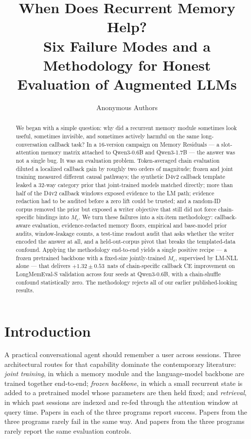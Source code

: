 \documentclass{article}
\title{When Does Recurrent Memory Help?\\
       Six Failure Modes and a Methodology for Honest Evaluation of Augmented LLMs}
\author{Anonymous Authors}
\newcommand{\Mc}{M_{\mathrm{c}}}
\begin{document}
\maketitle

\begin{abstract}
We began with a simple question: why did a recurrent memory module
sometimes look useful, sometimes invisible, and sometimes actively
harmful on the same long-conversation callback task?  In a
$16$-version campaign on Memory Residuals --- a slot-attention memory
matrix attached to Qwen3-0.6B and Qwen3-1.7B --- the answer was not a
single bug.  It was an evaluation problem.  Token-averaged chain
evaluation diluted a localized callback gain by roughly two orders of
magnitude; frozen and joint training measured different causal
pathways; the synthetic D4v2 callback template leaked a $32$-way
category prior that joint-trained models matched directly; more than
half of the D4v2 callback windows exposed evidence to the LM path;
evidence redaction had to be audited before a zero lift could be
trusted; and a random-ID corpus removed the prior but exposed a
writer objective that still did not force chain-specific bindings into
$\Mc$.  We turn these failures into a six-item methodology:
callback-aware evaluation, evidence-redacted memory floors, empirical
and base-model prior audits, window-leakage counts, a test-time
readout audit that asks whether the writer encoded the answer at all,
and a held-out-corpus pivot that breaks the templated-data confound.
Applying the methodology end-to-end yields a single positive recipe
--- a frozen pretrained backbone with a fixed-size jointly-trained
$\Mc$, supervised by LM-NLL alone --- that delivers
$+1.32 \pm 0.53$~nats of chain-specific callback CE improvement on
LongMemEval-S validation across four seeds at Qwen3-0.6B, with a
chain-shuffle confound statistically zero.  The methodology rejects
all of our earlier published-looking results.
\end{abstract}

\section{Introduction}
\label{sec:intro}

A practical conversational agent should remember a user across
sessions.  Three architectural routes for that capability dominate
the contemporary literature: \emph{joint training}, in which a memory
module and the language-model backbone are trained together
end-to-end; \emph{frozen backbone}, in which a small recurrent state
is added to a pretrained model whose parameters are then held fixed;
and \emph{retrieval}, in which past sessions are indexed and re-fed
through the attention window at query time.  Papers in each of the
three programs report success.  Papers from the three programs
rarely fail in the same way.  And papers from the three programs
rarely report the same evaluation controls.
\end{document}
